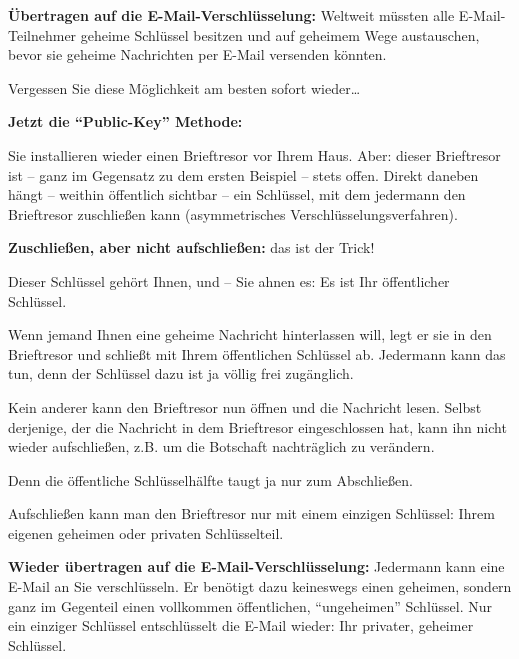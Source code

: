\documentclass[a4paper,11pt, oneside,openright,titlepage,dvips]{scrbook}
\newcommand{\Email}{E-Mail}
\newcommand{\IncludeImage}[2][]{\texorhtml{%
\texttt{[image: \#2]}%
}{%
\htmlimg{#2.png}%
}}
\begin{document}
\textbf{Übertragen auf die \Email{}-Verschlüsselung:} Weltweit müssten alle
\Email{}-Teilnehmer geheime Schlüssel besitzen und auf geheimem Wege
austauschen, bevor sie geheime Nachrichten per \Email{} versenden
könnten.

Vergessen Sie diese Möglichkeit am besten sofort wieder\ldots

\begin{center}
\IncludeImage[width=0.9\textwidth]{letter-out-of-safe}
\end{center}

\clearpage
\textbf{Jetzt die "`Public-Key"' Methode:}

Sie installieren wieder einen Brieftresor vor Ihrem Haus.  Aber:
dieser Brieftresor ist ­-- ganz im Gegensatz zu dem ersten Beispiel
-- stets offen.  Direkt daneben hängt --­ weithin öffentlich sichtbar
-- ein Schlüssel, mit dem jedermann den Brieftresor zuschließen kann
(asymmetrisches Verschlüsselungsverfahren).

\textbf{Zuschließen, aber nicht aufschließen:} das ist der Trick!

\begin{center}
\IncludeImage[width=0.7\textwidth]{pk-safe-open}
\end{center}

Dieser Schlüssel gehört Ihnen, und -- Sie ahnen es: Es ist Ihr
öffentlicher Schlüssel.

Wenn jemand Ihnen eine geheime Nachricht hinterlassen will, legt er
sie in den Brieftresor und schließt mit Ihrem öffentlichen Schlüssel
ab.  Jedermann kann das tun, denn der Schlüssel dazu ist ja völlig
frei zugänglich.

Kein anderer kann den Brieftresor nun öffnen und die Nachricht lesen.
Selbst derjenige, der die Nachricht in dem Brieftresor eingeschlossen
hat, kann ihn nicht wieder aufschließen, z.B. um die
Botschaft nachträglich zu verändern.

Denn die öffentliche Schlüsselhälfte taugt ja nur zum Abschließen.

Aufschließen kann man den Brieftresor nur mit einem einzigen
Schlüssel: Ihrem eigenen geheimen oder privaten Schlüsselteil.

\clearpage

\textbf{Wieder übertragen auf die \Email{}-Verschlüsselung:} Jedermann
kann eine \Email{} an Sie verschlüsseln. Er benötigt dazu keineswegs
einen geheimen, sondern ganz im Gegenteil einen vollkommen
öffentlichen, "`ungeheimen"' Schlüssel. Nur ein einziger Schlüssel
entschlüsselt die \Email{} wieder: Ihr privater, geheimer Schlüssel.
\end{document}
